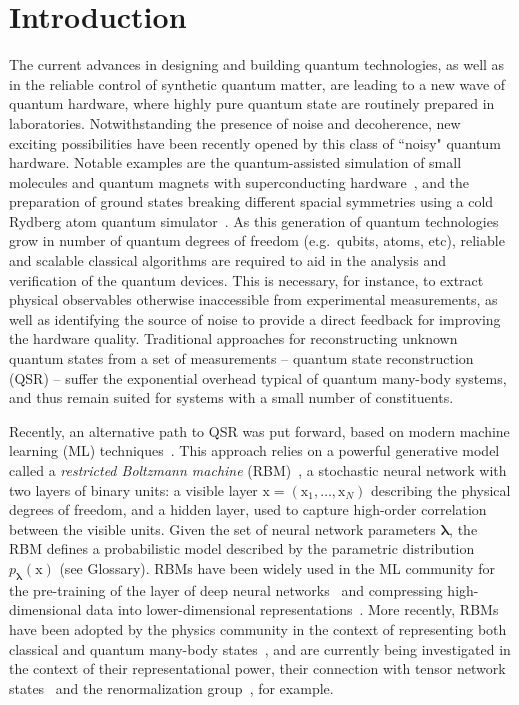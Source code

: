 \documentclass[submission, Phys]{SciPost}
\begin{document}
\section{Introduction}
The current advances in designing and building quantum technologies, as well as in the reliable control of synthetic quantum matter, are leading to a new wave of quantum hardware, where highly pure quantum state are routinely prepared in laboratories. Notwithstanding the presence of noise and decoherence, new exciting possibilities have been recently opened by this class of ``noisy" quantum hardware. Notable examples are the quantum-assisted simulation of small molecules and quantum magnets with superconducting hardware~\cite{gambetta17,gambetta18}, and the preparation of ground states breaking different spacial symmetries using a cold Rydberg atom quantum simulator~\cite{Bernien17}. As this generation of quantum technologies grow in number of quantum degrees of freedom (e.g.~qubits, atoms, etc), reliable and scalable classical algorithms are required to aid in the analysis and verification of the quantum devices. This is necessary, for instance, to extract physical observables otherwise inaccessible from experimental measurements, as well as identifying the source of noise to provide a direct feedback for improving the hardware quality. Traditional approaches for reconstructing unknown quantum states from a set of measurements -- quantum state reconstruction (QSR) -- suffer the exponential overhead typical of quantum many-body systems, and thus remain suited for systems with a small number of constituents. 

Recently, an alternative path to QSR was put forward, based on modern machine learning (ML) techniques~\cite{torlai2018tomography,TorlaiMixed}. This approach relies on a powerful generative model called a {\it restricted Boltzmann machine} (RBM)~\cite{Smolensky}, a stochastic neural network with two layers of binary units: a visible layer $\bm{\mathrm{x}}=(\mathrm{x}_1,\dots,\mathrm{x}_N)$ describing the physical degrees of freedom, and a hidden layer, used to capture high-order correlation between the visible units. Given the set of neural network parameters $\bm{\lambda}$, the RBM defines a probabilistic model described by the parametric distribution $p_{\bm{\lambda}}(\bm{\mathrm{x}})$ (see Glossary). RBMs have been widely used in the ML community for the pre-training of the layer of deep neural networks~\cite{Hinton06} and compressing high-dimensional data into lower-dimensional representations~\cite{Hinton504}. More recently, RBMs have been adopted by the physics community in the context of representing both classical and quantum many-body states~\cite{Torlai2016thermo, CarleoTroyer2017Science}, and are currently being investigated in the context of their representational power, their connection with tensor network states~\cite{GlasserCirac2018} and the renormalization group~\cite{Maciej}, for example.
\end{document}

